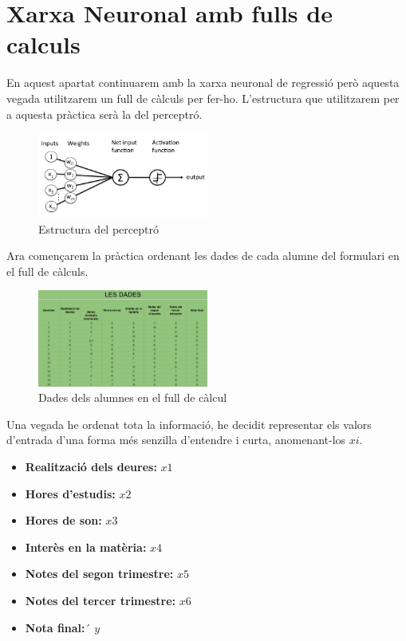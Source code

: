 \section{Xarxa Neuronal amb fulls de calculs}\label{sec:11}
En aquest apartat continuarem amb la xarxa neuronal de regressió però aquesta vegada utilitzarem un full de càlculs per fer-ho.
L'estructura que utilitzarem per a aquesta pràctica serà la del perceptró.

\begin{figure}[H]
    \centering
    \includegraphics[width=0.5\textwidth]{./figures/perceptro.png}
    \caption{Estructura del perceptró}
\end{figure}

Ara començarem la pràctica ordenant les dades de cada alumne del formulari en el full de càlculs.

\begin{figure}[H]
    \centering
    \includegraphics[width=0.5\textwidth]{./figures/Dades.png}
    \caption{Dades dels alumnes en el full de càlcul}
\end{figure}

Una vegada he ordenat tota la informació, he decidit representar els valors d'entrada d'una forma més senzilla d'entendre i curta, anomenant-los $xi$.
\begin{itemize}
 \item \textbf {Realització dels deures:} $x1$
 \item \textbf {Hores d'estudis:} $x2$
 \item \textbf {Hores de son:} $x3$
 \item \textbf {Interès en la matèria:} $x4$
 \item \textbf {Notes del segon trimestre:} $x5$
 \item \textbf {Notes del tercer trimestre:} $x6$
 \item \textbf {Nota final:}´ $y$
\end{itemize}

